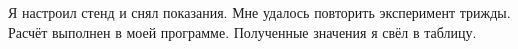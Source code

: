Я настроил стенд и снял показания. %
Мне удалось повторить эксперимент трижды. %
Расчёт выполнен в моей программе. %
Полученные значения я свёл в таблицу. %
